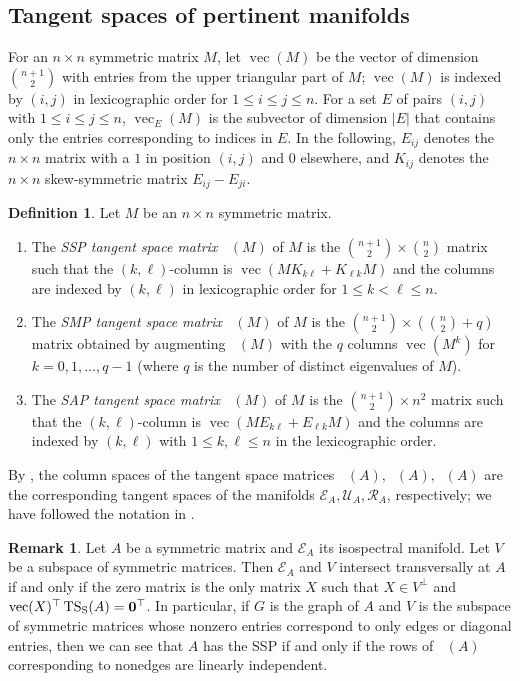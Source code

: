 \documentclass[11pt]{article}
\theoremstyle{definition}
\newtheorem{rem}[thm]{Remark}
\theoremstyle{definition}
\newtheorem{defn}[thm]{Definition}
\theoremstyle{definition}
\DeclareMathOperator{\TS}{TS_S}
\DeclareMathOperator{\TSS}{TS_S}
\DeclareMathOperator{\TSM}{TS_M}
\DeclareMathOperator{\TSA}{TS_A}
\newcommand{\bzero}{{\bf 0}}
\newcommand{\mrk}{\mathcal{R}} %
\newcommand{\mei}{\mathcal{E}} %
\newcommand{\mmu}{\mathcal{U}} %
\newcommand{\vect}{\operatorname{vec}}
\def\trans{^{\top}}
\begin{document}
\subsection{Tangent spaces of pertinent manifolds}

For an $n\times n$ symmetric matrix $M$, let $\vect(M)$ be the vector of dimension $\binom{n+1}{2}$ with entries from the upper triangular part of $M$; $\vect(M)$ is indexed by $(i,j)$ in  lexicographic order for $1\leq i\leq j\leq n$.  For a set $E$ of pairs $(i,j)$ with $1\leq i\leq j\leq n$, $\vect_E(M)$ is the subvector of dimension $|E|$ that contains only the entries corresponding to indices in $E$.
In the following, $E_{ij}$ denotes the $n\times n $ matrix with a $1$ in position $(i,j)$ and $0$ elsewhere, and
$K_{ij}$ denotes the $n\times n$ skew-symmetric matrix  $E_{ij}-E_{ji}$.

\begin{defn}\label{TSmatrices}  Let $M$ be an $n\times n$ symmetric matrix.  
\begin{enumerate}
\item The \emph{SSP tangent space matrix} $\TSS(M)$ of $M$ is the $\binom{n+1}{2}\times\binom{n}{2}$ matrix such that the $(k,\ell)$-column is $\vect(MK_{k\ell}+K_{\ell k}M)$ and the columns are indexed by $(k,\ell)$  in  lexicographic order for $1\leq k<\ell\leq n$.  %
\item The \emph{SMP tangent space matrix} $\TSM(M)$ of $M$ is the $\binom{n+1}{2}\times\left(\binom{n}{2}+q\right)$ matrix obtained by augmenting $\TSS(M)$ with the $q$ columns $\vect(M^k)$ for $k=0,1,\ldots, q-1$ (where $q$ is the number of distinct eigenvalues of $M$).
\item The \emph{SAP tangent space matrix} $\TSA(M)$ of $M$ is the $\binom{n+1}{2}\times n^2$ matrix such that the $(k,\ell)$-column is $\vect(ME_{k\ell}+E_{\ell k}M)$ and the columns are indexed by $(k,\ell)$ with $1\leq k,\ell\leq n$ in the lexicographic order.
\end{enumerate}
\end{defn}

By \cite[Theorem~27]{genSAP}, the column spaces of the tangent space matrices $\TSS(A),\TSM(A),\TSA(A)$ are the corresponding tangent spaces of the manifolds $\mei_A,\mmu_A,\mrk_A$, respectively; we have followed the notation in \cite{genSAP}.


\begin{rem}
\label{spacetvl}
Let $A$ be a symmetric matrix and $\mei_A$ its isospectral manifold.  Let $V$ be a subspace of symmetric matrices.  Then $\mei_A$ and $V$  intersect transversally at $A$ if and only if the zero matrix is the only matrix $X$ such that $X\in V^{\perp}$ and $ \vect(X)\trans \TS(A)=\bzero\trans$.  In particular, if $G$ is the graph of $A$ and $V$ is the subspace of symmetric matrices whose nonzero entries correspond to only edges or diagonal entries, then we can see that $A$ has the SSP if and only if the rows of $\TSS(A)$ corresponding to nonedges are linearly independent.
\end{rem}
\end{document}
